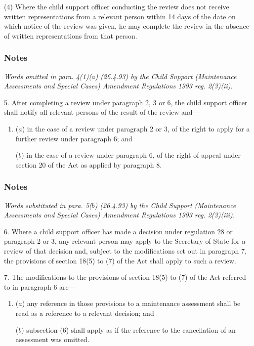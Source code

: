\documentclass[a4paper]{article}
\newcommand\amendment[1]{\subsubsection*{Notes}{\itshape\frenchspacing\footnotesize #1 \par\goodbreak}}
\begin{document}
(4) Where the child support officer conducting the review does not receive written representations from a relevant person within 14 days of the date on which notice of the review was given, he may complete the review in the absence of written representations from that person.

\amendment{
Words omitted in para. 4(1)($a$) (26.4.93) by the Child Support (Maintenance Assessments and Special Cases) Amendment Regulations 1993 reg. 2(3)(ii).
}

\medskip

5.  After completing a review under paragraph 2, 3 or 6, the child support officer shall notify all relevant persons of the result of the review and---
\begin{enumerate}\item[]
($a$) in the case of a review under paragraph 2 or 3, of the right to apply for a further review under paragraph 6; and

($b$) in the case of a review under 
paragraph 6, %
of the right of appeal under section 20 of the Act as applied by paragraph 8.
\end{enumerate}

\amendment{
Words substituted in para. 5($b$) (26.4.93) by the Child Support (Maintenance Assessments and Special Cases) Amendment Regulations 1993 reg. 2(3)(iii).
}

\medskip

6.  Where a child support officer has made a decision under regulation 28 or paragraph 2 or 3, any relevant person may apply to the Secretary of State for a review of that decision and, subject to the modifications set out in paragraph 7, the provisions of section 18(5) to (7) of the Act shall apply to such a review.

\medskip

7.  The modifications to the provisions of section 18(5) to (7) of the Act referred to in paragraph 6 are---
\begin{enumerate}\item[]
($a$) any reference in those provisions to a maintenance assessment shall be read as a reference to a relevant decision; and

($b$) subsection (6) shall apply as if the reference to the cancellation of an assessment was omitted.
\end{enumerate}

\medskip

\end{document}
